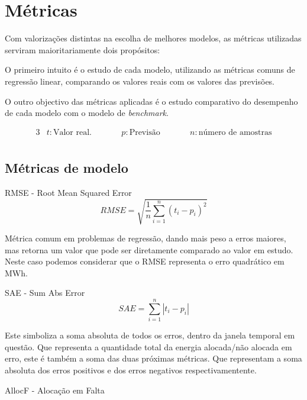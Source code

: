 \section{Métricas}

Com valorizações distintas na escolha de melhores modelos, as métricas utilizadas serviram maioritariamente dois propósitos:\par
O primeiro intuito é o estudo de cada modelo, utilizando as métricas comuns de regressão linear, comparando os valores reais com os valores das previsões.\par
O outro objectivo das métricas aplicadas é o estudo comparativo do desempenho de cada modelo com o modelo de \textit{benchmark}.\par

\begin{alignat*}{3} 
& t : \text{Valor real.} &\qquad& p : \text{Previsão} &\qquad& n : \text{número de amostras} \\
\end{alignat*}


\subsection{Métricas de modelo}

\bigskip
RMSE - Root Mean Squared Error \\

\begin{equation} \label{eq:rmse} 
    RMSE = \sqrt{\frac{1}{n} \sum_{i=1}^{n}(t_i - p_i)^2} 
\end{equation}
\smallskip

Métrica comum em problemas de regressão, dando mais peso a erros maiores, mas retorna um valor que pode ser diretamente comparado ao valor em estudo. Neste caso podemos considerar que o RMSE representa o erro quadrático em MWh.\par
\bigskip
SAE - Sum Abs Error \\


\begin{equation} \label{eq:sae} 
    SAE = \sum_{i=1}^{n}\left|t_i - p_i \right|
\end{equation}
\smallskip

Este simboliza a soma absoluta de todos os erros, dentro da janela temporal em questão. Que representa a quantidade total da energia alocada/não alocada em erro, este é também a soma das duas próximas métricas. Que representam a soma absoluta dos erros positivos e dos erros negativos respectivamentente.\par
\bigskip
AllocF - Alocação em Falta \\


